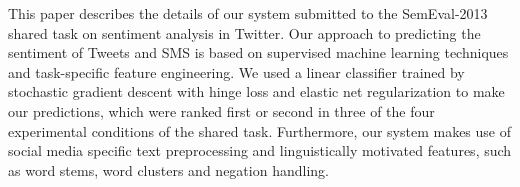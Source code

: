 This paper describes the details of our system submitted to the SemEval-2013 shared task on sentiment analysis in Twitter. Our approach to predicting the
 sentiment of Tweets and SMS is based on supervised machine learning techniques
 and task-specific feature engineering. We used a linear classifier trained by
 stochastic gradient descent with hinge loss and elastic net regularization to
 make our predictions, which were ranked first or second in three of the four
 experimental conditions of the shared task. Furthermore, our system makes use
 of social media specific text preprocessing and linguistically motivated
 features, such as word stems, word clusters and negation handling.

